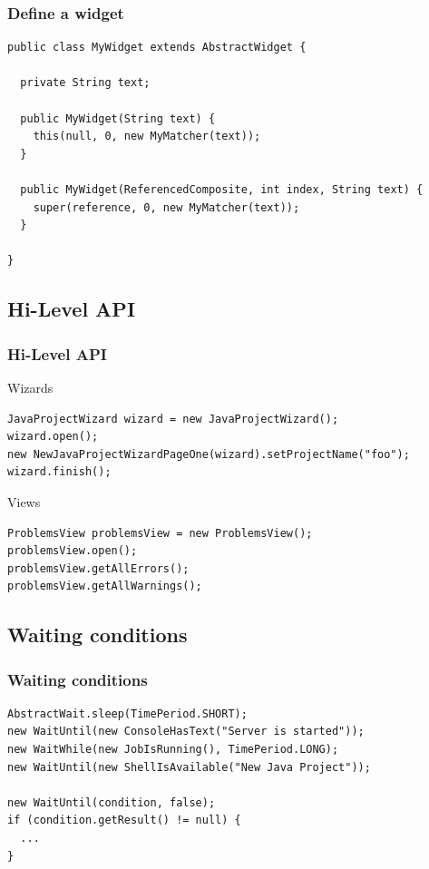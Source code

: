 \documentclass{beamer}
\begin{document}
\begin{frame}[fragile]
\frametitle{Define a widget}
\begin{lstlisting}
public class MyWidget extends AbstractWidget {

  private String text;

  public MyWidget(String text) {
    this(null, 0, new MyMatcher(text));
  }

  public MyWidget(ReferencedComposite, int index, String text) {
    super(reference, 0, new MyMatcher(text));
  }

}
\end{lstlisting}
\end{frame}

\subsection{Hi-Level API}
\begin{frame}[fragile]
\frametitle{Hi-Level API}
Wizards
\begin{lstlisting}
JavaProjectWizard wizard = new JavaProjectWizard();
wizard.open();
new NewJavaProjectWizardPageOne(wizard).setProjectName("foo");
wizard.finish();
\end{lstlisting}
\vspace{0.5cm}
Views
\begin{lstlisting}
ProblemsView problemsView = new ProblemsView();
problemsView.open();
problemsView.getAllErrors();
problemsView.getAllWarnings();
\end{lstlisting}
\end{frame}

\subsection{Waiting conditions}
\begin{frame}[fragile]
\frametitle{Waiting conditions}
\begin{lstlisting}
AbstractWait.sleep(TimePeriod.SHORT);
new WaitUntil(new ConsoleHasText("Server is started"));
new WaitWhile(new JobIsRunning(), TimePeriod.LONG);
new WaitUntil(new ShellIsAvailable("New Java Project"));

new WaitUntil(condition, false);
if (condition.getResult() != null) {
  ...
}
\end{lstlisting}
\end{frame}
\end{document}
